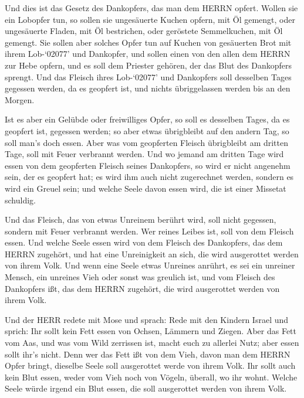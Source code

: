  Und dies ist das Gesetz des Dankopfers, das man dem HERRN
opfert.  Wollen sie ein Lobopfer tun, so sollen sie
ungesäuerte Kuchen opfern, mit Öl gemengt, oder ungesäuerte Fladen, mit
Öl bestrichen, oder geröstete Semmelkuchen, mit Öl gemengt.
 Sie sollen aber solches Opfer tun auf Kuchen von
gesäuerten Brot mit ihrem Lob-`02077' und Dankopfer,  und
sollen einen von den allen dem HERRN zur Hebe opfern, und es soll dem
Priester gehören, der das Blut des Dankopfers sprengt.  Und
das Fleisch ihres Lob-`02077' und Dankopfers soll desselben Tages
gegessen werden, da es geopfert ist, und nichts übriggelassen werden bis
an den Morgen.

 Ist es aber ein Gelübde oder freiwilliges Opfer, so soll
es desselben Tages, da es geopfert ist, gegessen werden; so aber etwas
übrigbleibt auf den andern Tag, so soll man's doch essen. 
Aber was vom geopferten Fleisch übrigbleibt am dritten Tage, soll mit
Feuer verbrannt werden.  Und wo jemand am dritten Tage wird
essen von dem geopferten Fleisch seines Dankopfers, so wird er nicht
angenehm sein, der es geopfert hat; es wird ihm auch nicht zugerechnet
werden, sondern es wird ein Greuel sein; und welche Seele davon essen
wird, die ist einer Missetat schuldig.

 Und das Fleisch, das von etwas Unreinem berührt wird, soll
nicht gegessen, sondern mit Feuer verbrannt werden. Wer reines Leibes
ist, soll von dem Fleisch essen.  Und welche Seele essen
wird von dem Fleisch des Dankopfers, das dem HERRN zugehört, und hat
eine Unreinigkeit an sich, die wird ausgerottet werden von ihrem Volk.
 Und wenn eine Seele etwas Unreines anrührt, es sei ein
unreiner Mensch, ein unreines Vieh oder sonst was greulich ist, und vom
Fleisch des Dankopfers ißt, das dem HERRN zugehört, die wird ausgerottet
werden von ihrem Volk.

 Und der HERR redete mit Mose und sprach: 
Rede mit den Kindern Israel und sprich: Ihr sollt kein Fett essen von
Ochsen, Lämmern und Ziegen.  Aber das Fett vom Aas, und was
vom Wild zerrissen ist, macht euch zu allerlei Nutz; aber essen sollt
ihr's nicht.  Denn wer das Fett ißt von dem Vieh, davon man
dem HERRN Opfer bringt, dieselbe Seele soll ausgerottet werde von ihrem
Volk.  Ihr sollt auch kein Blut essen, weder vom Vieh noch
von Vögeln, überall, wo ihr wohnt.  Welche Seele würde
irgend ein Blut essen, die soll ausgerottet werden von ihrem Volk.

